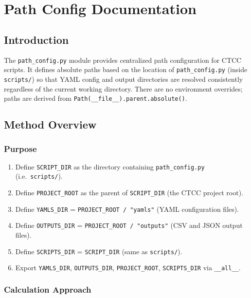 \documentclass[ctcc_full_documentation.tex]{subfiles}
\begin{document}
\chapter{Path Config Documentation}

\section{Introduction}

The \texttt{path\_config.py} module provides centralized path configuration for CTCC scripts. It defines absolute paths based on the location of \texttt{path\_config.py} (inside \texttt{scripts/}) so that YAML config and output directories are resolved consistently regardless of the current working directory. There are no environment overrides; paths are derived from \texttt{Path(\_\_file\_\_).parent.absolute()}.

\section{Method Overview}

\subsection{Purpose}

\begin{enumerate}
    \item Define \texttt{SCRIPT\_DIR} as the directory containing \texttt{path\_config.py} (i.e.\ \texttt{scripts/}).
    \item Define \texttt{PROJECT\_ROOT} as the parent of \texttt{SCRIPT\_DIR} (the CTCC project root).
    \item Define \texttt{YAMLS\_DIR} = \texttt{PROJECT\_ROOT / "yamls"} (YAML configuration files).
    \item Define \texttt{OUTPUTS\_DIR} = \texttt{PROJECT\_ROOT / "outputs"} (CSV and JSON output files).
    \item Define \texttt{SCRIPTS\_DIR} = \texttt{SCRIPT\_DIR} (same as \texttt{scripts/}).
    \item Export \texttt{YAMLS\_DIR}, \texttt{OUTPUTS\_DIR}, \texttt{PROJECT\_ROOT}, \texttt{SCRIPTS\_DIR} via \texttt{\_\_all\_\_}.
\end{enumerate}

\subsection{Calculation Approach}
\end{document}
